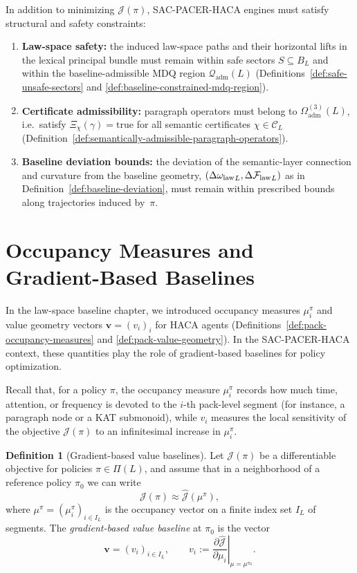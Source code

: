 \documentclass[11pt]{book}
\theoremstyle{plain}
\theoremstyle{definition}
\newtheorem{definition}[theorem]{Definition}
\theoremstyle{remark}
\begin{document}
In addition to minimizing $\mathcal{J}(\pi)$, SAC-PACER-HACA engines
must satisfy structural and safety constraints:
\begin{enumerate}
  \item \textbf{Law-space safety:} the induced law-space paths and
        their horizontal lifts in the lexical principal bundle must
        remain within safe sectors $S\subseteq B_L$ and within the
        baseline-admissible MDQ region
        $\mathcal{Q}_{\mathrm{adm}}(L)$
        (Definitions~\ref{def:safe-unsafe-sectors} and
        \ref{def:baseline-constrained-mdq-region}).
  \item \textbf{Certificate admissibility:} paragraph operators must
        belong to $\Omega^{(3)}_{\mathrm{adm}}(L)$, i.e.\ satisfy
        $\Xi_\chi(\gamma)=\mathrm{true}$ for all semantic certificates
        $\chi\in\mathcal{C}_L$
        (Definition~\ref{def:semantically-admissible-paragraph-operators}).
  \item \textbf{Baseline deviation bounds:} the deviation of the
        semantic-layer connection and curvature from the baseline
        geometry, $(\Delta{\ensuremath{\omega_{\mathrm{law}}}}_L,\Delta{\ensuremath{\mathcal{F}_{\mathrm{law}}}}_L)$ as in
        Definition~\ref{def:baseline-deviation}, must remain within
        prescribed bounds along trajectories induced by~$\pi$.
\end{enumerate}



\section[Occupancy Measures and Gradient-Based Baselines]{Occupancy Measures and Gradient-Based Baselines}


In the law-space baseline chapter, we introduced occupancy measures
$\mu_i^\pi$ and value geometry vectors $\mathbf{v}=(v_i)_i$ for
HACA agents (Definitions~\ref{def:pack-occupancy-measures} and
\ref{def:pack-value-geometry}). In the SAC-PACER-HACA context, these
quantities play the role of gradient-based baselines for policy
optimization.

Recall that, for a policy $\pi$, the occupancy measure $\mu_i^\pi$
records how much time, attention, or frequency is devoted to the
$i$-th pack-level segment (for instance, a paragraph node or a KAT
submonoid), while $v_i$ measures the local sensitivity of the objective
$\mathcal{J}(\pi)$ to an infinitesimal increase in $\mu_i^\pi$.

\begin{definition}[Gradient-based value baselines]
\label{def:gradient-based-baseline}
Let $\mathcal{J}(\pi)$ be a differentiable objective for policies
$\pi\in\Pi(L)$, and assume that in a neighborhood of a reference
policy $\pi_0$ we can write
\[
  \mathcal{J}(\pi)
  \approx
  \widehat{\mathcal{J}}(\mu^\pi),
\]
where $\mu^\pi=(\mu_i^\pi)_{i\in I_L}$ is the occupancy vector on a
finite index set $I_L$ of segments. The \emph{gradient-based value
baseline} at $\pi_0$ is the vector
\[
  \mathbf{v}
  =
  (v_i)_{i\in I_L},
  \qquad
  v_i
  :=
  \left.
    \frac{\partial \widehat{\mathcal{J}}}{\partial \mu_i}
  \right|_{\mu=\mu^{\pi_0}}.
\]
\end{definition}
\end{document}
